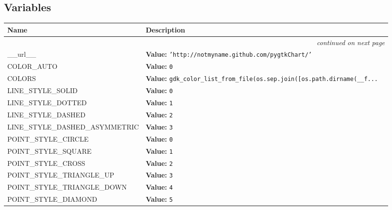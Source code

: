
  \subsection{Variables}

    \vspace{-1cm}
\hspace{\varindent}\begin{longtable}{|p{\varnamewidth}|p{\vardescrwidth}|l}
\cline{1-2}
\cline{1-2} \centering \textbf{Name} & \centering \textbf{Description}& \\
\cline{1-2}
\endhead\cline{1-2}\multicolumn{3}{r}{\small\textit{continued on next page}}\\\endfoot\cline{1-2}
\endlastfoot\raggedright \_\-\_\-u\-r\-l\-\_\-\_\- & \raggedright \textbf{Value:} 
{\tt \texttt{'}\texttt{http://notmyname.github.com/pygtkChart/}\texttt{'}}&\\
\cline{1-2}
\raggedright C\-O\-L\-O\-R\-\_\-A\-U\-T\-O\- & \raggedright \textbf{Value:} 
{\tt 0}&\\
\cline{1-2}
\raggedright C\-O\-L\-O\-R\-S\- & \raggedright \textbf{Value:} 
{\tt gdk\_color\_list\_from\_file(os.sep.join([os.path.dirname(\_\_f\texttt{...}}&\\
\cline{1-2}
\raggedright L\-I\-N\-E\-\_\-S\-T\-Y\-L\-E\-\_\-S\-O\-L\-I\-D\- & \raggedright \textbf{Value:} 
{\tt 0}&\\
\cline{1-2}
\raggedright L\-I\-N\-E\-\_\-S\-T\-Y\-L\-E\-\_\-D\-O\-T\-T\-E\-D\- & \raggedright \textbf{Value:} 
{\tt 1}&\\
\cline{1-2}
\raggedright L\-I\-N\-E\-\_\-S\-T\-Y\-L\-E\-\_\-D\-A\-S\-H\-E\-D\- & \raggedright \textbf{Value:} 
{\tt 2}&\\
\cline{1-2}
\raggedright L\-I\-N\-E\-\_\-S\-T\-Y\-L\-E\-\_\-D\-A\-S\-H\-E\-D\-\_\-A\-S\-Y\-M\-M\-E\-T\-R\-I\-C\- & \raggedright \textbf{Value:} 
{\tt 3}&\\
\cline{1-2}
\raggedright P\-O\-I\-N\-T\-\_\-S\-T\-Y\-L\-E\-\_\-C\-I\-R\-C\-L\-E\- & \raggedright \textbf{Value:} 
{\tt 0}&\\
\cline{1-2}
\raggedright P\-O\-I\-N\-T\-\_\-S\-T\-Y\-L\-E\-\_\-S\-Q\-U\-A\-R\-E\- & \raggedright \textbf{Value:} 
{\tt 1}&\\
\cline{1-2}
\raggedright P\-O\-I\-N\-T\-\_\-S\-T\-Y\-L\-E\-\_\-C\-R\-O\-S\-S\- & \raggedright \textbf{Value:} 
{\tt 2}&\\
\cline{1-2}
\raggedright P\-O\-I\-N\-T\-\_\-S\-T\-Y\-L\-E\-\_\-T\-R\-I\-A\-N\-G\-L\-E\-\_\-U\-P\- & \raggedright \textbf{Value:} 
{\tt 3}&\\
\cline{1-2}
\raggedright P\-O\-I\-N\-T\-\_\-S\-T\-Y\-L\-E\-\_\-T\-R\-I\-A\-N\-G\-L\-E\-\_\-D\-O\-W\-N\- & \raggedright \textbf{Value:} 
{\tt 4}&\\
\cline{1-2}
\raggedright P\-O\-I\-N\-T\-\_\-S\-T\-Y\-L\-E\-\_\-D\-I\-A\-M\-O\-N\-D\- & \raggedright \textbf{Value:} 
{\tt 5}&\\
\cline{1-2}
\end{longtable}

